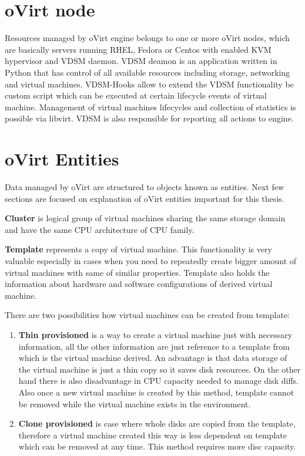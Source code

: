 \section{oVirt node}
Resources managed by oVirt engine belongs to one or more oVirt nodes, which are basically servers running RHEL, Fedora or Centos with enabled KVM\cite{kvm} hypervisor and VDSM daemon. VDSM deamon is an application written in Python that has control of all available resources including storage, networking and virtual machines. VDSM-Hooks\cite{hooks} allow to extend the VDSM functionality be custom script which can be executed at certain lifecycle events of virtual machine. Management of virtual machines lifecycles and collection of statistics is possible via libvirt\cite{libvirt}. VDSM is also responsible for reporting all actions to engine.

\section{oVirt Entities}
Data managed by oVirt are structured to objects known as entities. Next few sections are focused on explanation of oVirt entities important for this thesis.

\textbf{Cluster} is logical group of virtual machines sharing the same storage domain and have the same CPU architecture of CPU family.

\textbf{Template} represents a copy of virtual machine. This functionality is very valuable especially in cases when you need to repeatedly create bigger amount of virtual machines with same of similar properties. Template also holds the information about hardware and software configurations of derived virtual machine. 

\noindent There are two possibilities how virtual machines can be created from template: 
\begin{enumerate}

\item \textbf{Thin provisioned} is a way to create a virtual machine just with necessary information, all the other information are just reference to a template from which is the virtual machine derived. An advantage is that data storage of the virtual machine is just a thin copy so it saves disk resources. On the other hand there is also disadvantage in CPU capacity needed to manage disk diffs. Also once a new virtual machine is created by this method, template cannot be removed while the virtual machine exists in the environment. 

\item \textbf{Clone provisioned} is case where whole disks are copied from the template, therefore a virtual machine created this way is less dependent on template which can be removed at any time. This method requires more disc capacity.
\end{enumerate} 


